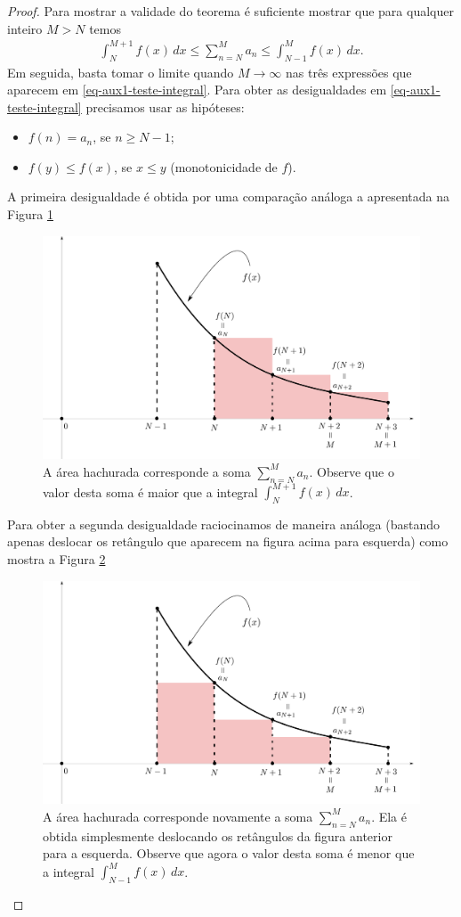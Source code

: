 \begin{proof}
Para mostrar a validade do teorema é suficiente mostrar que para qualquer inteiro
$M>N$ temos 
\begin{align}\label{eq-aux1-teste-integral}
\int_{N}^{M+1} f(x)\, dx
\leqslant 
\sum_{n=N}^{M} a_n
\leqslant
\int_{N-1}^{M} f(x)\, dx.
\end{align}
Em seguida, basta tomar o limite quando $M\to\infty$ nas três expressões que aparecem
em \eqref{eq-aux1-teste-integral}. 
Para obter as desigualdades em \eqref{eq-aux1-teste-integral} precisamos usar as hipóteses:
\begin{itemize}
	\item $f(n)=a_n$, se $n\geqslant N-1$;
	\item $f(y)\leqslant f(x)$, se $x\leqslant y$ (monotonicidade de $f$). 
\end{itemize}

A primeira desigualdade é obtida por uma comparação análoga a apresentada na 
Figura \ref{fig:teste-integral-redimensionado1}
\begin{figure}[h]
\centering
\includegraphics[width=0.63\linewidth]{Figuras/teste-integral-redimensionado1}
\caption{A área hachurada corresponde a soma $\sum_{n=N}^{M}a_n$. Observe que 
o valor desta soma é maior que a integral $\int_{N}^{M+1}f(x)\, dx$.}
\label{fig:teste-integral-redimensionado1}
\end{figure}

Para obter a segunda desigualdade raciocinamos de maneira análoga (bastando apenas
deslocar os retângulo que aparecem na figura acima para esquerda) como mostra
a Figura \ref{fig:teste-integral-redimensionado2}
\begin{figure}[H]
\centering
\includegraphics[width=0.63\linewidth]{Figuras/teste-integral-redimensionado2}
\caption{A área hachurada corresponde novamente a soma $\sum_{n=N}^{M}a_n$. Ela é
obtida simplesmente deslocando os retângulos da figura anterior para a esquerda. 
Observe que agora o valor desta soma é menor que a integral $\int_{N-1}^{M}f(x)\, dx$.}
\label{fig:teste-integral-redimensionado2}
\end{figure}
  
  

\end{proof}
